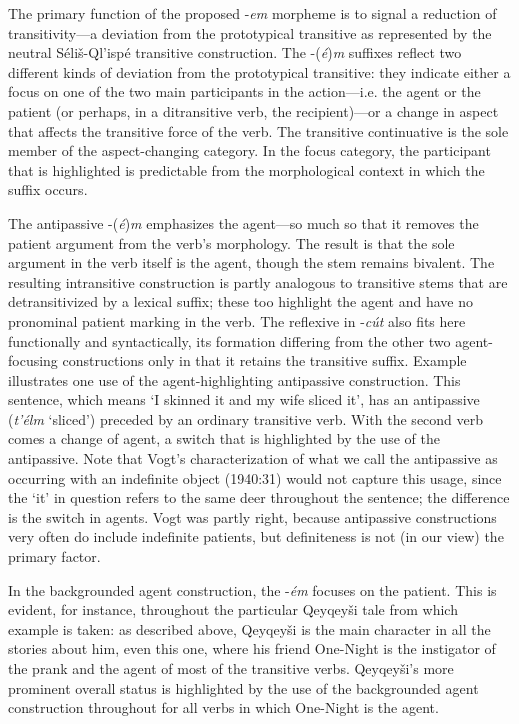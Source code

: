 \documentclass[output=paper,colorlinks,citecolor=brown]{langscibook}
\begin{document}
The primary function of the proposed -\emph{em} morpheme is to signal
a reduction of transitivity---a deviation from the prototypical
transitive as represented by the neutral S\'eli\v{s}-Ql'isp\'e
transitive construction.  The -({\em \'e}){\em m} suffixes reflect two
different kinds of deviation from the prototypical transitive: they
indicate either a focus on one of the two main participants in the
action---i.e. the agent or the patient (or perhaps, in a
ditransitive verb, the recipient)---or a change in aspect that
affects the transitive force of the verb.  The transitive continuative
is the sole member of the aspect-changing category.  In the focus
category, the participant that is highlighted is predictable from the
morphological context in which the suffix occurs.


The antipassive -(\emph{\'e})\emph{m} emphasizes the agent---so much
so that it removes the patient argument from the verb's morphology.
The result is that the sole argument in the verb itself is the agent,
though the stem remains bivalent.  The resulting intransitive
construction is partly analogous to transitive stems that are
detransitivized by a lexical suffix; these too highlight the agent and
have no pronominal patient marking in the verb.  The reflexive in
-\emph{c\'ut} also fits here functionally and syntactically, its
formation differing from the other two agent-focusing constructions
only in that it retains the transitive suffix.  Example  illustrates
one use of the agent-highlighting antipassive construction.  This
sentence, which means `I skinned it and my wife sliced it', has an
antipassive (\emph{t'\'elm} `sliced') preceded by an ordinary
transitive verb.  With the second verb comes a change of agent, a
switch that is highlighted by the use of the antipassive.  Note that
Vogt's characterization of what we call the antipassive as occurring
with an indefinite object \citeyearpar[31]{Vogt:1940} (1940:31) would not capture this usage, since the `it' in question refers to the same deer throughout the
sentence; the difference is the switch in agents.  Vogt was partly
right, because antipassive constructions very often do include
indefinite patients, but definiteness is not (in our view) the primary
factor.


In the backgrounded agent construction, the -\emph{\'em} focuses on the
patient.  This is evident, for instance, throughout the particular
Qeyqey\v{s}i tale from which example  is taken: as described above,
Qeyqey\v{s}i is the main character in all the stories about him, even
this one, where his friend One-Night is the instigator of the prank
and the agent of most of the transitive verbs.  Qeyqey\v{s}i's more
prominent overall status is highlighted by the use of the backgrounded
agent construction throughout for all verbs in which One-Night is the
agent.
\end{document}
